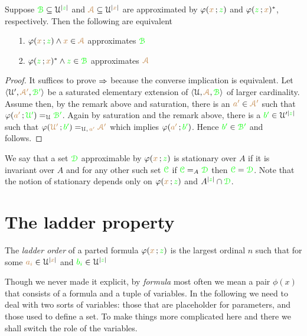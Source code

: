 \documentclass[creche.tex]{subfiles}
\begin{document}
\begin{lemma}\label{lem_harrington}
Suppose ${\color{green}{\EuScript B}}\subseteq\EuScript U^{|{\color{green} z}|}$ and ${\color{brown}{\EuScript A}}\subseteq\EuScript U^{|{\color{brown} x}|}$ are approximated by $\varphi({\color{brown} x}\,;{\color{green} z})$ and  $\varphi({\color{green} z}\,;{\color{brown} x})^*$, respectively. Then the following are equivalent
\begin{itemize}
\item[1.] $\varphi({\color{brown} x}\,;{\color{green} z})\wedge{\color{brown}x}\in{{\color{brown}{\EuScript A}}}$ approximates ${\color{green}{\EuScript B}}$
\item[2.] $\varphi({\color{green} z}\,;{\color{brown} x})^*\wedge{\color{green}z}\in{{\color{green}{\EuScript B}}}$ approximates ${\color{brown}{\EuScript A}}$ 
\end{itemize}
\end{lemma}
\begin{proof}
\def\mrsA{{\mr\Aa'}}
\def\grsB{{\gr\B'}}
It suffices to prove $\Rightarrow$ because the converse implication is equivalent. Let $\<\U',\mrsA,\grsB\>$ be a saturated  elementary extension of  $\langle\EuScript U,{\color{brown}{\EuScript A}},{\color{green}{\EuScript B}}\rangle$ of larger cardinality.  Assume  then, by the remark above and saturation, there is an ${\mr a'}\in\mrsA$ such that $\phi({\mr a'}\,;{\gr\U'})=_{\U}\grsB$. Again by saturation and the remark above, there is a ${\color{green} b'}\in\EuScript U'^{|{\color{green} z}|}$ such that $\phi({\mr\U'}\,;{\gr b'})=_{\U,\, {\mr a'}}\mrsA$ which implies $\varphi({\color{brown} a'}\,;{\color{green} b'})$. Hence ${\gr b'}\in\grsB$ and  follows.
\end{proof}

We say that a set ${\color{green}\EuScript D}$ approximable by $\varphi({\color{brown} x}\,;{\color{green} z})$ is stationary over $A$ if it is invariant over $A$ and for any other such set ${\color{green}\EuScript C}$ if ${\color{green}\EuScript C}=_A{\color{green}\EuScript D}$ then ${\color{green}\EuScript C}={\color{green}\EuScript D}$. Note that the notion of stationary depends only on $\varphi({\color{brown} x}\,;{\color{green} z})$ and $A^{|{\color{green} z}|}\cap{\color{green}\EuScript D}$. 




\section{The ladder property}

The \emph{ladder order\/} of a parted formula $\varphi({\color{brown} x}\,;{\color{green} z})$ is the largest ordinal $n$ such that for some ${\color{brown} a_i}\in\EuScript U^{|{\color{brown} x}|}$ and ${\color{green} b_i}\in\EuScript U^{|{\color{green} z}|}$ 

Though we never made it explicit, by \textit{formula\/} most often we mean a pair $\phi(x)$ that consists of a formula and a tuple of variables. In the following we need to deal with two sorts of variables: those that are placeholder for parameters, and those used to define a set. To make things more complicated here and there we shall switch the role of the variables.
\end{document}
